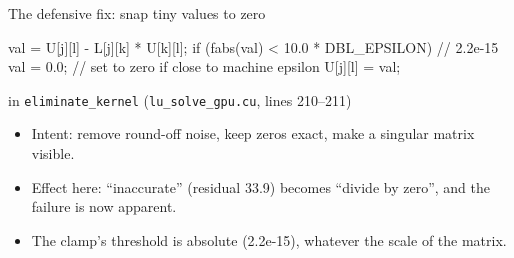 \documentclass[aspectratio=169,10pt,xcolor=table]{beamer}
\begin{document}
\begin{frame}[fragile]{The defensive fix: snap tiny values to zero}
\begin{semiverbatim}\footnotesize
val = U[j][l] - L[j][k] * U[k][l];
if (fabs(val) < 10.0 * DBL_EPSILON)   // 2.2e-15
    val = 0.0;     // set to zero if close to machine epsilon
U[j][l] = val;
\end{semiverbatim}
{\tiny in \texttt{eliminate\_kernel} (\texttt{lu\_solve\_gpu.cu}, lines 210--211)}

\vspace{3mm}\centering
{}

\vspace{3mm}\raggedright\small
\begin{itemize}
\item Intent: remove round-off noise, keep zeros exact, make a singular matrix visible.
\item Effect here: ``inaccurate'' (residual 33.9) becomes ``divide by zero'', and the failure is now apparent.
\item The clamp's threshold is absolute (2.2e-15), whatever the scale of the matrix.
\end{itemize}
\end{frame}
\end{document}
